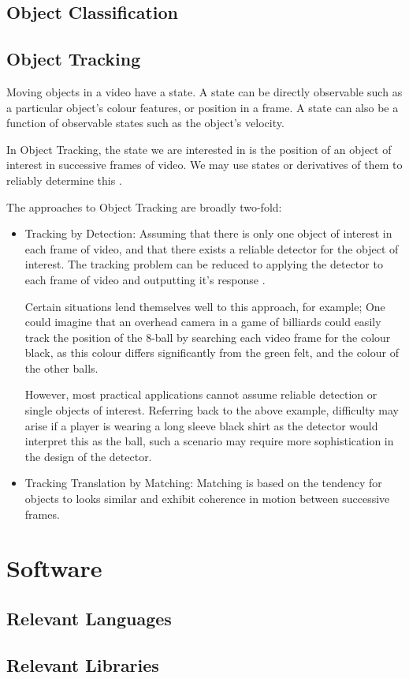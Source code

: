 \subsection{Object Classification}

\subsection{Object Tracking}
Moving objects in a video have a state. A state can be directly observable such as a
particular object's colour features, or position in a frame. A state can also be a function
of observable states such as the object's velocity.

In Object Tracking, the state we are interested in is the position of an object
of interest in successive frames of video. We may use states or derivatives of
them to reliably determine this \cite{Forsyth2012}.

The approaches to Object Tracking are broadly two-fold:
\begin{itemize}
    \item Tracking by Detection:
        Assuming that there is only one object of interest in each frame of
        video, and that there exists a reliable detector for the object of
        interest. The tracking problem can be reduced to applying the detector
        to each frame of video and outputting it's response \cite{Forsyth2012}.

        Certain situations lend themselves well to this approach, for example;
        One could imagine that an overhead camera in a game of billiards could
        easily track the position of the 8-ball by searching each video frame
        for the colour black, as this colour differs significantly from the
        green felt, and the colour of the other balls.
        
        However, most practical applications cannot assume reliable detection or
        single objects of interest. Referring back to the above example,
        difficulty may arise if a player is wearing a long sleeve black shirt as
        the detector would interpret this as the ball, such a scenario may
        require more sophistication in the design of the detector.

    \item Tracking Translation by Matching:
        Matching is based on the tendency for objects to looks similar and
        exhibit coherence in motion between successive frames.
       
        


\end{itemize}   

\section{Software}

\subsection{Relevant Languages}
\subsection{Relevant Libraries}




